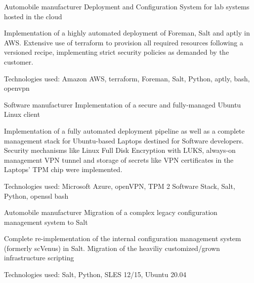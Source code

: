 

\begin{cventries}
  \cventry
    {Automobile manufacturer}
    {Deployment and Configuration System for lab systems hosted in the cloud}
    {}
    {}
    {
      \begin{cvitems}
      \item Implementation of a highly automated deployment of Foreman, Salt and aptly in AWS.
        Extensive use of terraform to provision all required resources following a versioned recipe,
        implementing strict security policies as demanded by the customer.
      \item Technologies used: Amazon AWS, terraform, Foreman, Salt, Python, aptly, bash, openvpn
      \end{cvitems}
    }
  \cventry
    {Software manufacturer}
    {Implementation of a secure and fully-managed Ubuntu Linux client}
    {}
    {}
    {
      \begin{cvitems}
      \item Implementation of a fully automated deployment pipeline as well as a complete management
        stack for Ubuntu-based Laptops destined for Software developers. Security mechanisms like
        Linux Full Disk Encryption with LUKS, always-on management VPN tunnel and storage of secrets
        like VPN certificates in the Laptops' TPM chip were implemented.
      \item Technologies used: Microsoft Azure, openVPN, TPM 2 Software Stack, Salt, Python,
        openssl
        bash
      \end{cvitems}
    }
  \cventry
    {Automobile manufacturer}
    {Migration of a complex legacy configuration management system to Salt}
    {}
    {}
    {
      \begin{cvitems}
      \item Complete re-implementation of the internal configuration management
        system (formerly scVenus) in Salt. Migration of the heaviliy customized/grown infrastructure
        scripting
      \item Technologies used: Salt, Python, SLES 12/15, Ubuntu 20.04

\end{cvitems}}
\end{cventries}
